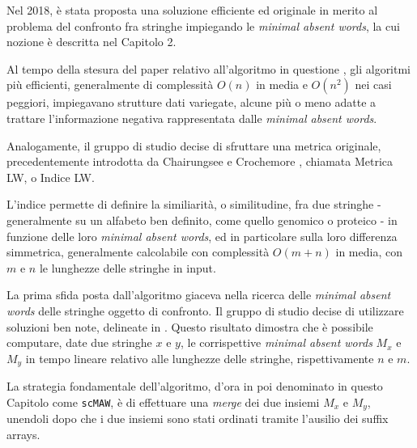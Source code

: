 Nel 2018, è stata proposta una soluzione efficiente ed originale in merito al problema del confronto fra stringhe impiegando le \textit{minimal absent words}, la cui nozione è descritta nel Capitolo 2. 

\vspace{3mm}

Al tempo della stesura del paper relativo all'algoritmo in questione \cite{scMAW}, gli algoritmi più efficienti, generalmente di complessità $O(n)$ in media e $O(n^2 )$ nei casi peggiori, impiegavano strutture dati variegate, alcune più o meno adatte a trattare l'informazione negativa rappresentata dalle \textit{minimal absent words}. 

\vspace{3mm}

Analogamente, il gruppo di studio decise di sfruttare una metrica originale, precedentemente introdotta da Chairungsee e Crochemore \cite{maw1}, chiamata Metrica LW, o Indice LW. 

\vspace{3mm}

L'indice permette di definire la similiarità, o similitudine, fra due stringhe - generalmente su un alfabeto ben definito, come quello genomico o proteico - in funzione delle loro \textit{minimal absent words}, ed in particolare sulla loro differenza simmetrica, generalmente calcolabile con complessità $O(m+n)$ in media, con $m$ e $n$ le lunghezze delle stringhe in input.

\vspace{3mm}

La prima sfida posta dall'algoritmo giaceva nella ricerca delle \textit{minimal absent words} delle stringhe oggetto di confronto. Il gruppo di studio decise di utilizzare soluzioni ben note, delineate in \cite{maw1}. Questo risultato dimostra che è possibile computare, date due stringhe $x$ e $y$, le corrispettive \textit{minimal absent words} $M_x$ e $M_y$ in tempo lineare relativo alle lunghezze delle stringhe, rispettivamente $n$ e $m$. 

\vspace{3mm}

La strategia fondamentale dell'algoritmo, d'ora in poi denominato in questo Capitolo come \verb|scMAW|, è di effettuare una \textit{merge} dei due insiemi $M_x$ e $M_y$, unendoli dopo che i due insiemi sono stati ordinati tramite l'ausilio dei suffix arrays. 

\vspace{3mm}

